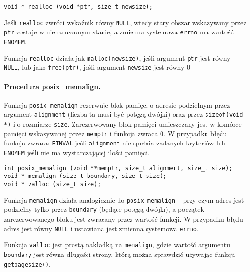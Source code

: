 \documentclass[12pt,a4paper,titlepage,twoside]{mwart}
\begin{document}
\vspace{2ex}
\begin{lstlisting}[caption={Prototyp procedury \texttt{realloc}.}]
void * realloc (void *ptr, size_t newsize);
\end{lstlisting}

Jeśli \texttt{realloc} zwróci wskaźnik równy \texttt{NULL}, wtedy stary obszar
wskazywany przez \texttt{ptr} zostaje w nienaruszonym stanie, a zmienna
systemowa \texttt{errno} ma wartość \texttt{ENOMEM}.

Funkcja \texttt{realloc} działa jak \texttt{malloc(newsize)}, jeśli argument
\texttt{ptr} jest równy \texttt{NULL}, lub jako \texttt{free(ptr)}, jeśli
argument \texttt{newsize} jest równy $0$.

\paragraph{Procedura posix\_memalign.}

Funkcja \texttt{posix\_memalign} rezerwuje blok pamięci o adresie podzielnym
przez argument \texttt{alignment} (liczba ta musi być potęgą dwójki) oraz przez
\texttt{sizeof(void *)} i o rozmiarze \texttt{size}. Zarezerwowany blok pamięci
umieszczany jest w komórce pamięci wskazywanej przez \texttt{memptr} i funkcja
zwraca $0$. W przypadku błędu funkcja zwraca: \texttt{EINVAL} jeśli
\texttt{alignment} nie spełnia zadanych kryteriów lub \texttt{ENOMEM} jeśli nie
ma wystarczającej ilości pamięci.

\vspace{2ex}
\begin{lstlisting}[caption={Prototyp procedury \texttt{posix\_memalign}, \texttt{memalign} i \texttt{valloc}.},xleftmargin=0cm,xrightmargin=0cm]
int posix_memalign (void **memptr, size_t alignment, size_t size);
void * memalign (size_t boundary, size_t size);
void * valloc (size_t size);
\end{lstlisting}

Funkcja \texttt{memalign} działa analogicznie do \texttt{posix\_memalign} --
przy czym adres jest podzielny tylko przez \texttt{boundary} (będące potęgą
dwójki), a początek zarezerwowanego bloku jest zwracany przez wartość funkcji.
W przypadku błędu adres jest równy \texttt{NULL} i ustawiana jest zmienna
systemowa \texttt{errno}.

Funkcja \texttt{valloc} jest prostą nakładką na \texttt{memalign}, gdzie
wartość argumentu \texttt{boundary} jest równa długości strony, którą można
sprawdzić używając funkcji \texttt{getpagesize()}.
\end{document}
